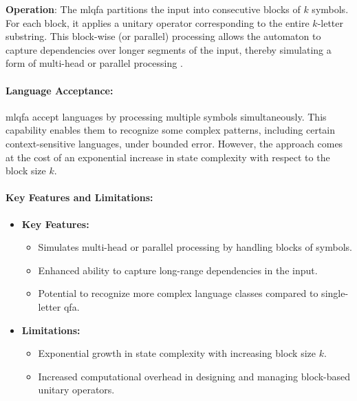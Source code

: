 \textbf{Operation}:  
The \gls{mlqfa} partitions the input into consecutive blocks of \( k \) symbols. For each block, it applies a unitary operator corresponding to the entire \( k \)-letter substring. This block-wise (or parallel) processing allows the automaton to capture dependencies over longer segments of the input, thereby simulating a form of multi-head or parallel processing \cite{belovs2007multi}.

\paragraph{Language Acceptance:}  
\gls{mlqfa} accept languages by processing multiple symbols simultaneously. This capability enables them to recognize some complex patterns, including certain context-sensitive languages, under bounded error. However, the approach comes at the cost of an exponential increase in state complexity with respect to the block size \( k \).

\paragraph{Key Features and Limitations:}
\begin{itemize}
    \item \textbf{Key Features:}
    \begin{itemize}
        \item Simulates multi-head or parallel processing by handling blocks of symbols.
        \item Enhanced ability to capture long-range dependencies in the input.
        \item Potential to recognize more complex language classes compared to single-letter \gls{qfa}.
    \end{itemize}
    \item \textbf{Limitations:}
    \begin{itemize}
        \item Exponential growth in state complexity with increasing block size \( k \).
        \item Increased computational overhead in designing and managing block-based unitary operators.
    \end{itemize}
\end{itemize}


